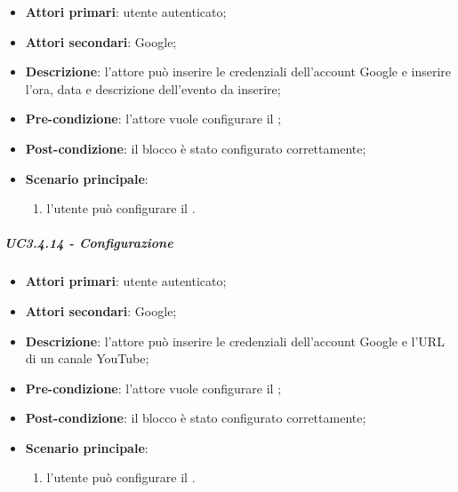 \begin{itemize}
\item \textbf{Attori primari}: utente autenticato;

\item \textbf{Attori secondari}: Google;

\item \textbf{Descrizione}: l'attore può inserire le credenziali dell'account Google e inserire l'ora, data e descrizione dell'evento da inserire;

\item \textbf{Pre-condizione}: l'attore vuole configurare il \BCalendario{};

\item \textbf{Post-condizione}:  il blocco è stato configurato correttamente;

\item \textbf{Scenario principale}:
\begin{enumerate}
\item  l'utente può configurare il \BCalendario{}.

\end{enumerate}
\end{itemize}

\subparagraph{UC3.4.14 - Configurazione \BYouTube{}}

\begin{itemize}
\item \textbf{Attori primari}: utente autenticato;

\item \textbf{Attori secondari}: Google;

\item \textbf{Descrizione}: l'attore può inserire le credenziali dell'account Google e l'URL di un canale YouTube;

\item \textbf{Pre-condizione}: l'attore vuole configurare il \BYouTube{};

\item \textbf{Post-condizione}:  il blocco è stato configurato correttamente;

\item \textbf{Scenario principale}:
\begin{enumerate}
\item  l'utente può configurare il \BYouTube{}.

\end{enumerate}
\end{itemize}

